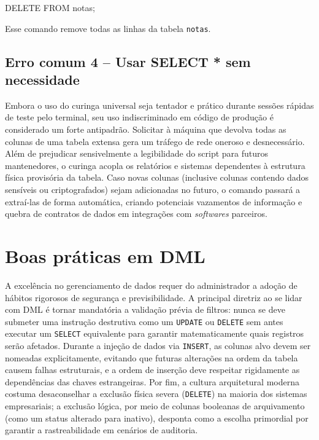 \begin{sqlcode}
DELETE FROM notas;
\end{sqlcode}

Esse comando remove todas as linhas da tabela \texttt{notas}.

\subsection{Erro comum 4 -- Usar SELECT * sem necessidade}

Embora o uso do curinga universal seja tentador e prático durante sessões rápidas de teste pelo terminal, seu uso indiscriminado em código de produção é considerado um forte antipadrão. Solicitar à máquina que devolva todas as colunas de uma tabela extensa gera um tráfego de rede oneroso e desnecessário. Além de prejudicar sensivelmente a legibilidade do script para futuros mantenedores, o curinga acopla os relatórios e sistemas dependentes à estrutura física provisória da tabela. Caso novas colunas (inclusive colunas contendo dados sensíveis ou criptografados) sejam adicionadas no futuro, o comando passará a extraí-las de forma automática, criando potenciais vazamentos de informação e quebra de contratos de dados em integrações com \textit{softwares} parceiros.

\section{Boas práticas em DML}

A excelência no gerenciamento de dados requer do administrador a adoção de hábitos rigorosos de segurança e previsibilidade. A principal diretriz ao se lidar com DML é tornar mandatória a validação prévia de filtros: nunca se deve submeter uma instrução destrutiva como um \texttt{UPDATE} ou \texttt{DELETE} sem antes executar um \texttt{SELECT} equivalente para garantir matematicamente quais registros serão afetados. Durante a injeção de dados via \texttt{INSERT}, as colunas alvo devem ser nomeadas explicitamente, evitando que futuras alterações na ordem da tabela causem falhas estruturais, e a ordem de inserção deve respeitar rigidamente as dependências das chaves estrangeiras. Por fim, a cultura arquitetural moderna costuma desaconselhar a exclusão física severa (\texttt{DELETE}) na maioria dos sistemas empresariais; a exclusão lógica, por meio de colunas booleanas de arquivamento (como um status alterado para inativo), desponta como a escolha primordial por garantir a rastreabilidade em cenários de auditoria.

